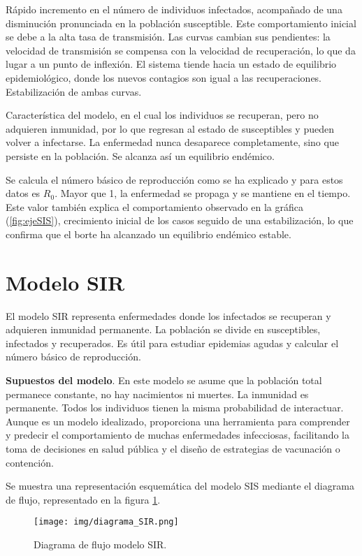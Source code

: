 Rápido incremento en el número de individuos infectados, acompañado de una disminución pronunciada en la población susceptible. Este comportamiento inicial se debe a la alta tasa de transmisión.
Las curvas cambian sus pendientes: la velocidad de transmisión se compensa con la velocidad de recuperación, lo que da lugar a un punto de inflexión. El sistema tiende hacia un estado de equilibrio epidemiológico, donde los nuevos contagios son igual a las recuperaciones. Estabilización de ambas curvas.

Característica del modelo, en el cual los individuos se recuperan, pero no adquieren inmunidad, por lo que regresan al estado de susceptibles y pueden volver a infectarse. La enfermedad nunca desaparece completamente, sino que persiste en la población. Se alcanza así un equilibrio endémico.

Se calcula el número básico de reproducción como se ha explicado y para estos datos es $R_0$. Mayor que 1, la enfermedad se propaga y se mantiene en el tiempo. Este valor también explica el comportamiento observado en la gráfica (\ref{fig:ejeSIS}), crecimiento inicial de los casos seguido de una estabilización, lo que confirma que el borte ha alcanzado un equilibrio endémico estable.






\section{Modelo SIR}
El modelo SIR representa enfermedades donde los infectados se recuperan y adquieren inmunidad permanente. La población se divide en susceptibles, infectados y recuperados. Es útil para estudiar epidemias agudas y calcular el número básico de reproducción.

\textbf{Supuestos del modelo}. En este modelo se asume que la población total permanece constante, no hay nacimientos ni muertes. La inmunidad es permanente. Todos los individuos tienen la misma probabilidad de interactuar.
Aunque es un modelo idealizado, proporciona una herramienta para comprender y predecir el comportamiento de muchas enfermedades infecciosas, facilitando la toma de decisiones en salud pública y el diseño de estrategias de vacunación o contención.

Se muestra una representación esquemática del modelo SIS mediante el diagrama de flujo, representado en la figura \ref{fig:diagrama SIR}.
\begin{figure}[H]
    \centering
    \texttt{[image: img/diagrama\_SIR.png]}
    \caption{Diagrama de flujo modelo SIR.}
    \label{fig:diagrama SIR}
    \vspace{0.5cm} %
\end{figure}

